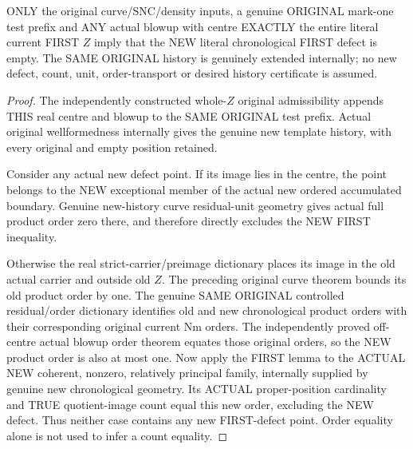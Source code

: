 \begin{theorem}
\label{hir:sharp-original-curve-whole-defect-blowup-new-defect-empty}
\leanok
ONLY the original curve/SNC/density inputs, a genuine ORIGINAL mark-one
test prefix and ANY actual blowup with centre EXACTLY the entire literal
current FIRST $Z$ imply that the NEW literal chronological FIRST defect
is empty. The SAME ORIGINAL history is genuinely extended internally;
no new defect, count, unit, order-transport or desired history certificate
is assumed.
\end{theorem}
\begin{proof}
The independently constructed whole-$Z$ original admissibility appends
THIS real centre and blowup to the SAME ORIGINAL test prefix. Actual
original wellformedness internally gives the genuine new template
history, with every original and empty position retained.

Consider any actual new defect point. If its image lies in the centre,
the point belongs to the NEW exceptional member of the actual new
ordered accumulated boundary. Genuine new-history curve residual-unit
geometry gives actual full product order zero there, and therefore
directly excludes the NEW FIRST inequality.

Otherwise the real strict-carrier/preimage dictionary places its image
in the old actual carrier and outside old $Z$. The preceding original
curve theorem bounds its old product order by one. The genuine SAME
ORIGINAL controlled residual/order dictionary identifies old and new
chronological product orders with their corresponding original current
Nm orders. The independently proved off-centre actual blowup order
theorem equates those original orders, so the NEW product order is also
at most one. Now apply the FIRST lemma to the ACTUAL NEW coherent,
nonzero, relatively principal family, internally supplied by genuine new
chronological geometry. Its ACTUAL proper-position cardinality and TRUE
quotient-image count equal this new order, excluding the NEW defect.
Thus neither case contains any new FIRST-defect point. Order equality
alone is not used to infer a count equality.
\end{proof}

